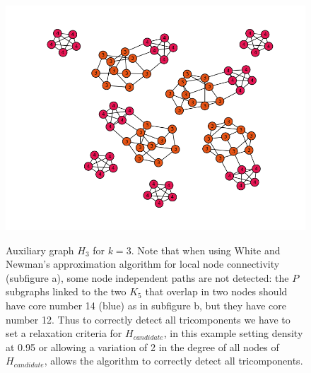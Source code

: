 \begin{figure}[H]
{\label{fig:subgraphs3}
\includegraphics[scale=0.36]{figures/illustrative_candidates_3}
}
\hspace{.05in}

\caption[Auxiliary graph $H_3$ for $k=3$.]{Auxiliary graph $H_3$ for $k=3$. Note that when using White and Newman's approximation algorithm for local node connectivity (subfigure a), some node independent paths are not detected: the $P$ subgraphs linked to the two $K_5$ that overlap in two nodes should have core number 14 (blue) as in subfigure b, but they have core number 12. Thus to correctly detect all tricomponents we have to set a relaxation criteria for $H_{candidate}$, in this example setting density at 0.95 or allowing a variation of 2 in the degree of all nodes of $H_{candidate}$, allows the algorithm to correctly detect all tricomponents.}
\label{fig:example_3}
\end{figure}



